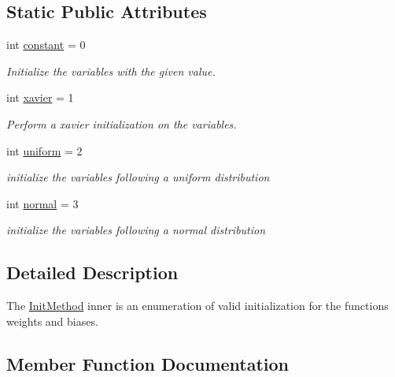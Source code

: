 \subsection*{Static Public Attributes}
\begin{DoxyCompactItemize}
\item 
int \hyperlink{classDQN-Deepmind-NIPS-2013_1_1dqn_1_1ConvNet_1_1InitMethod_ace1d7606694c2c82f5b4640a34b58a1c}{constant} = 0
\begin{DoxyCompactList}\small\item\em Initialize the variables with the given value. \end{DoxyCompactList}\item 
int \hyperlink{classDQN-Deepmind-NIPS-2013_1_1dqn_1_1ConvNet_1_1InitMethod_a40f9ca5144076077f6c2a28ca6983c1d}{xavier} = 1
\begin{DoxyCompactList}\small\item\em Perform a xavier initialization on the variables. \end{DoxyCompactList}\item 
int \hyperlink{classDQN-Deepmind-NIPS-2013_1_1dqn_1_1ConvNet_1_1InitMethod_ac26aff95fc96a42c00df1ef7cd7c7282}{uniform} = 2
\begin{DoxyCompactList}\small\item\em initialize the variables following a uniform distribution \end{DoxyCompactList}\item 
int \hyperlink{classDQN-Deepmind-NIPS-2013_1_1dqn_1_1ConvNet_1_1InitMethod_ad08fb9ba0ef227e2465bc0949566edac}{normal} = 3
\begin{DoxyCompactList}\small\item\em initialize the variables following a normal distribution \end{DoxyCompactList}\end{DoxyCompactItemize}


\subsection{Detailed Description}
The \hyperlink{classDQN-Deepmind-NIPS-2013_1_1dqn_1_1ConvNet_1_1InitMethod}{Init\+Method} inner is an enumeration of valid initialization for the functions \textquotesingle{}weights\textquotesingle{} and \textquotesingle{}biases\textquotesingle{}. 

\subsection{Member Function Documentation}
\hypertarget{classDQN-Deepmind-NIPS-2013_1_1dqn_1_1ConvNet_1_1InitMethod_ae6c011ae724bdf51a3dc37c739170612}{}\label{classDQN-Deepmind-NIPS-2013_1_1dqn_1_1ConvNet_1_1InitMethod_ae6c011ae724bdf51a3dc37c739170612} 
